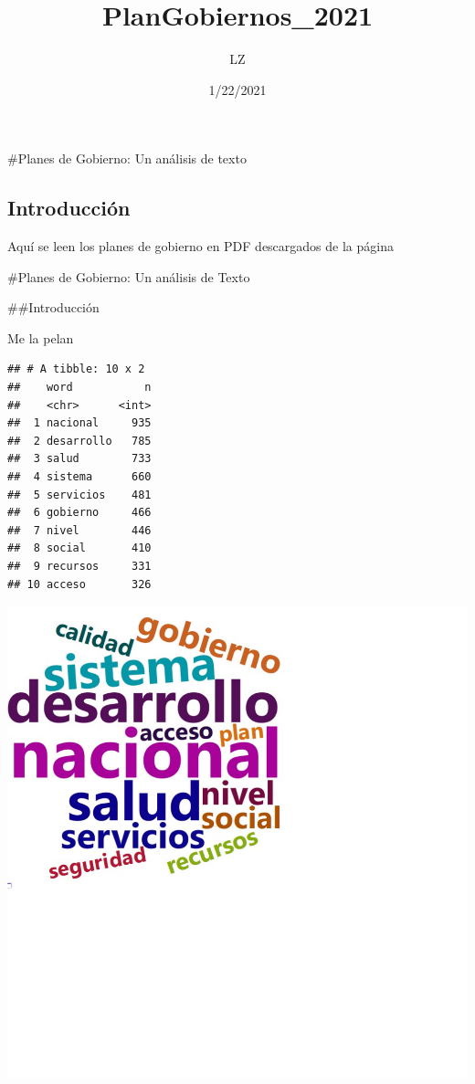 \documentclass[]{tufte-handout}
\title{PlanGobiernos\_2021}
\author{LZ}
\date{1/22/2021}
\begin{document}
\maketitle




\#Planes de Gobierno: Un análisis de texto

\hypertarget{introducciuxf3n}{%
\subsection{Introducción}\label{introducciuxf3n}}

Aquí se leen los planes de gobierno en PDF descargados de la página

\#Planes de Gobierno: Un análisis de Texto

\#\#Introducción

Me la pelan

\begin{verbatim}
## # A tibble: 10 x 2
##    word           n
##    <chr>      <int>
##  1 nacional     935
##  2 desarrollo   785
##  3 salud        733
##  4 sistema      660
##  5 servicios    481
##  6 gobierno     466
##  7 nivel        446
##  8 social       410
##  9 recursos     331
## 10 acceso       326
\end{verbatim}

\includegraphics{Figs/unnamed-chunk-5-1}
\end{document}
